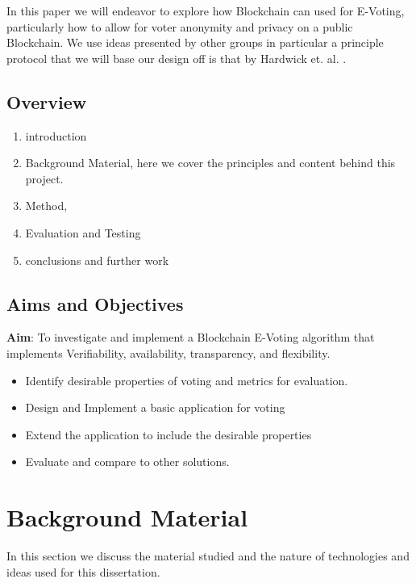 \documentclass{entcs}
\begin{document}
In this paper we will endeavor to explore how Blockchain can used for E-Voting, particularly how to allow for voter anonymity and privacy on a public Blockchain. We use ideas presented by other groups in particular a principle protocol that we will base our design off is that by Hardwick et. al. \cite{hardwick2018}.

\subsection{Overview}

\begin{enumerate}
    \item introduction
    \item Background Material, here we cover the principles and content behind this project.
    \item Method, 
    \item Evaluation and Testing
    \item conclusions and further work
\end{enumerate}

\subsection{Aims and Objectives}
\begin{center}
    {\bf Aim}: To investigate and implement a Blockchain E-Voting algorithm that implements Verifiability, availability, transparency, and flexibility. 
\end{center}
\begin{itemize}
    \item Identify desirable properties of voting and metrics for evaluation.
    \item Design and Implement a basic application for voting
    \item Extend the application to include the desirable properties
    \item Evaluate and compare to other solutions.
\end{itemize}

\section{Background Material}
In this section we discuss the material studied and the nature of technologies and ideas used for this dissertation.
\end{document}
